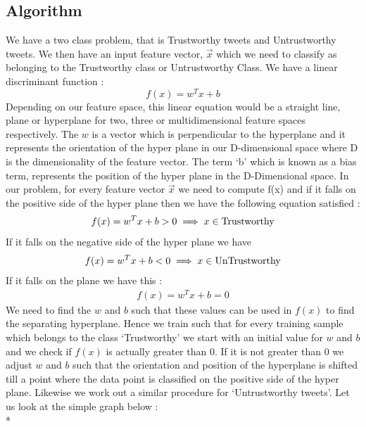\subsection{Algorithm}
We have a two class problem, that is Trustworthy tweets and Untrustworthy tweets. We then have an input feature vector, $\vec x$ which we need to classify as belonging to the Trustworthy class or Untrustworthy Class.  We have a linear discriminant function : 
$$f(x) = w^Tx + b$$
\noindent
Depending on our feature space, this linear equation would be a straight line, plane or hyperplane for two, three or multidimensional feature spaces respectively. The $w$ is a vector which is perpendicular to the hyperplane and it represents the orientation of the hyper plane in our D-dimensional space where D is the dimensionality of the feature vector. The term `b' which is known as a bias term, represents the position of the hyper plane in the D-Dimensional space. In our problem, for every feature vector $\vec x$ we need to compute f(x) and if it falls on the positive side of the hyper plane then we have the following equation satisfied : 
\begin{gather}
f(x) = w^Tx + b > 0 \implies x \in \textup{Trustworthy}
\end{gather}
If it falls on the negative side of the hyper plane we have 
\begin{gather}
f(x) = w^Tx + b < 0 \implies x \in \textup{UnTrustworthy}
\end{gather}
If it falls on the plane we have this : 
\begin{gather}
f(x) = w^Tx + b = 0
\end{gather}
We need to find the $w$ and $b$ such that these values can be used in $f(x)$ to find the separating hyperplane. Hence we train such that for every training sample which belongs to the class `Trustworthy' we start with an initial value for $w$ and $b$ and we check if $f(x)$ is actually greater than 0. If it is not greater than 0 we adjust $w$ and $b$ such that the orientation and position of the hyperplane is shifted till a point where the data point is classified on the positive side of the hyper plane. Likewise we work out a similar procedure for `Untrustworthy tweets'. Let us look at the simple graph below : \\*

